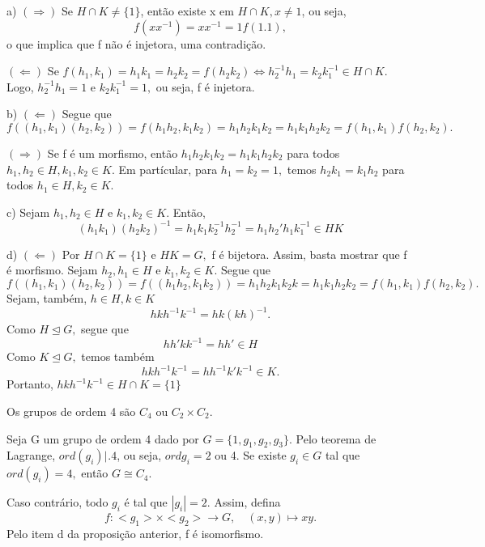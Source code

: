 \documentclass[algebra_notes.tex]{subfiles}
\begin{document}
\begin{proof*}
	a) $(\Rightarrow)$ Se $H\cap{K}\neq\{1\}$, então existe x em $H\cap{K}, x\neq 1$, ou seja,
	$$
		f(xx^{-1}) = xx^{-1} = 1 f(1.1),
	$$
	o que implica que f não é injetora, uma contradição.

	$(\Leftarrow)$ Se $f(h_{1},k_{1})=h_{1}k_{1}=h_{2}k_{2} = f(h_{2}k_{2}) \Longleftrightarrow h_{2}^{-1}h_{1} = k_{2}k_{1}^{-1}\in H\cap K$. Logo,
	$h_{2}^{-1}h_{1} = 1$ e $k_{2}k_{1}^{-1} = 1,$ ou seja, f é injetora.

	b) $(\Leftarrow)$ Segue que $f((h_{1},k_{1})(h_{2},k_{2})) = f(h_{1}h_{2}, k_{1}k_{2}) = h_{1}h_{2}k_{1}k_{2} = h_{1}k_{1}h_{2}k_{2} =
		f(h_{1}, k_{1})f(h_{2},k_{2}).$

	$(\Rightarrow)$ Se f é um morfismo, então $h_{1}h_{2}k_{1}k_{2} = h_{1}k_{1}h_{2}k_{2}$ para todos $h_{1},h_{2}\in H, k_{1},k_{2}\in K.$
	Em partícular, para $h_{1}=k_{2}=1,$ temos $h_{2}k_{1} = k_{1}h_{2}$ para todos $h_{1}\in H, k_{2}\in K.$

	c) Sejam $h_{1}, h_{2}\in H$ e $k_{1}, k_{2}\in K$. Então,
	$$
		(h_{1}k_{1})(h_{2}k_{2})^{-1} = h_{1}k_{1}k_{2}^{-1}h_{2}^{-1} = h_{1}h_{2}'h_{1}k_{1}^{-1}\in HK
	$$

	d) $(\Leftarrow)$ Por $H\cap K = \{1\}$ e $HK = G,$ f é bijetora. Assim, basta mostrar que f é morfismo.
	Sejam $h_{2}, h_{1}\in H$ e $k_{1}, k_{2}\in K$. Segue que
	$$
		f((h_{1},k_{1})(h_{2}, k_{2})) = f((h_{1}h_{2}, k_{1}k_{2})) = h_{1}h_{2}k_{1}k_{2}k = h_{1}k_{1}h_{2}k_{2} = f(h_{1}, k_{1})f(h_{2}, k_{2}).
	$$
	Sejam, também, $h\in H, k\in K$
	$$
		hkh^{-1}k^{-1} = hk(kh)^{-1}.
	$$
	Como $H\trianglelefteq{G},$ segue que
	$$
		hh'kk^{-1} = hh'\in H
	$$
	Como $K\trianglelefteq{G},$ temos também
	$$
		hkh^{-1}k^{-1} = hh^{-1}k'k^{-1}\in K.
	$$
	Portanto, $hkh^{-1}k^{-1}\in H\cap K=\{1\}$ \qedsymbol
\end{proof*}
\begin{prop*}
	Os grupos de ordem 4 são $C_{4}$ ou $C_{2}\times C_{2}.$
\end{prop*}
\begin{proof*}
	Seja G um grupo de ordem 4 dado por $G=\{1, g_{1}, g_{2}, g_{3}\}$. Pelo teorema de Lagrange, $ord(g_{i})\biggl|_{}^{}\biggr.4$,
	ou seja, $ord g_{i} = 2$ ou 4. Se existe $g_{i}\in G$ tal que $ord(g_{i}) = 4,$ então $G\cong C_{4}.$

	Caso contrário, todo $g_{i}$ é tal que $|g_{i}|=2.$ Assim, defina
	$$
		f:<g_{1}>\times<g_{2}>\rightarrow G,\quad (x,y)\mapsto xy.
	$$
	Pelo item d da proposição anterior, f é isomorfismo. \qedsymbol
\end{proof*}
\end{document}
